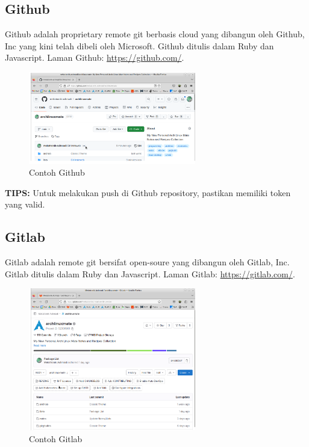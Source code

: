 \documentclass[12pt]{book}
\begin{document}
	\subsection{Github}
	
	Github adalah proprietary remote git berbasis cloud yang dibangun oleh Github, Inc yang kini telah dibeli oleh Microsoft.
	Github ditulis dalam Ruby dan Javascript.
	Laman Github: \url{https://github.com/}.
	
	\begin{figure}[!ht]
		\centering
		\includegraphics[width=0.65\textwidth]{images/git/github}
		\caption{Contoh Github}
	\end{figure}
	
	\textbf{TIPS:} Untuk melakukan push di Github repository, pastikan memiliki token yang valid.
	
	\subsection{Gitlab}
	
	Gitlab adalah remote git bersifat open-soure yang dibangun oleh Gitlab, Inc.
	Gitlab ditulis dalam Ruby dan Javascript.
	Laman Gitlab: \url{https://gitlab.com/}.
	
	\begin{figure}[!ht]
		\centering
		\includegraphics[width=0.65\textwidth]{images/git/gitlab}
		\caption{Contoh Gitlab}
	\end{figure}
	
\end{document}
